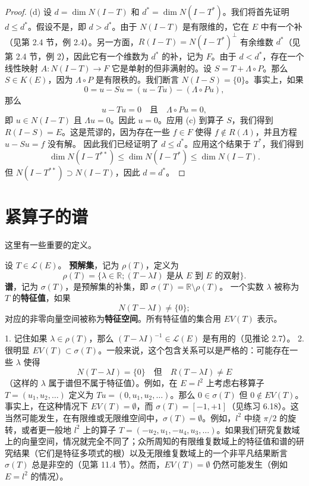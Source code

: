 \begin{proof}
(d) 设 \(d=\dim N(I-T)\) 和 \(d^*=\dim N(I-T^*)\)。我们将首先证明 \(d \le d^*\)。假设不是，即 \(d>d^*\)。由于 \(N(I-T)\) 是有限维的，它在 \(E\) 中有一个补（见第 2.4 节，例 2.4）。另一方面，\(R(I-T)=N(I-T^*)^\perp\) 有余维数 \(d^*\)（见第 2.4 节，例 2），因此它有一个维数为 \(d^*\) 的补，记为 \(F\)。由于 \(d<d^*\)，存在一个线性映射 \(A:N(I-T) \to F\) 它是单射的但非满射的。设 \(S=T+\Lambda \circ P\)。那么 \(S \in K(E)\)，因为 \(\Lambda \circ P\) 是有限秩的。我们断言 \(N(I-S) = \{0\}\)。事实上，如果
\[
0 = u - Su = (u-Tu) - (\Lambda \circ Pu),
\]
那么
\[
u-Tu=0 \quad \text{且} \quad \Lambda \circ Pu = 0,
\]
即 \(u \in N(I-T)\) 且 \(\Lambda u = 0\)。因此 \(u=0\)。应用 (c) 到算子 \(S\)，我们得到 \(R(I-S)=E\)。这是荒谬的，因为存在一些 \(f \in F\) 使得 \(f \notin R(\Lambda)\)，并且方程 \(u-Su=f\) 没有解。
因此我们已经证明了 \(d \le d^*\)。应用这个结果于 \(T^*\)，我们得到
\[
\dim N(I-T^{**}) \le \dim N(I-T^*) \le \dim N(I-T).
\]
但 \(N(I-T^{**}) \supset N(I-T)\)，因此 \(d=d^*\)。
\end{proof}

\section{紧算子的谱}
这里有一些重要的定义。

\begin{definition}
设 \(T \in \mathcal{L}(E)\)。
\textbf{预解集}，记为 \(\rho(T)\)，定义为
\[
\rho(T) = \{\lambda \in \mathbb{R}; (T - \lambda I) \text{ 是从 } E \text{ 到 } E \text{ 的双射}\}.
\]
\textbf{谱}，记为 \(\sigma(T)\)，是预解集的补集，即 \(\sigma(T) = \mathbb{R} \setminus \rho(T)\)。
一个实数 \(\lambda\) 被称为 \(T\) 的\textbf{特征值}，如果
\[
N(T - \lambda I) \ne \{0\};
\]
对应的非零向量空间被称为\textbf{特征空间}。所有特征值的集合用 \(EV(T)\) 表示。
\end{definition}
1. 记住如果 \(\lambda \in \rho(T)\)，那么 \((T - \lambda I)^{-1} \in \mathcal{L}(E)\) 是有用的（见推论 2.7）。
2. 很明显 \(EV(T) \subset \sigma(T)\)。一般来说，这个包含关系可以是严格的：可能存在一些 \(\lambda\) 使得
\[
N(T - \lambda I) = \{0\} \quad \text{但} \quad R(T - \lambda I) \ne E
\]
（这样的 \(\lambda\) 属于谱但不属于特征值）。例如，在 \(E = l^2\) 上考虑右移算子 \(T=(u_1, u_2, \ldots)\) 定义为 \(Tu=(0, u_1, u_2, \ldots)\)。那么 \(0 \in \sigma(T)\) 但 \(0 \notin EV(T)\)。事实上，在这种情况下 \(EV(T) = \emptyset\)，而 \(\sigma(T) = [-1, +1]\)（见练习 6.18）。这当然可能发生，在有限维或无限维空间中，\(\sigma(T)=\emptyset\)。例如，\(l^2\) 中绕 \(\pi/2\) 的旋转，或者更一般地 \(l^2\) 上的算子 \(T = (-u_2, u_1, -u_4, u_3, \ldots)\)。如果我们研究复数域上的向量空间，情况就完全不同了；众所周知的有限维复数域上的特征值和谱的研究结果（它们是特征多项式的根）以及无限维复数域上的一个非平凡结果断言 \(\sigma(T)\) 总是非空的（见第 11.4 节）。然而，\(EV(T)=\emptyset\) 仍然可能发生（例如 \(E=l^2\) 的情况）。

